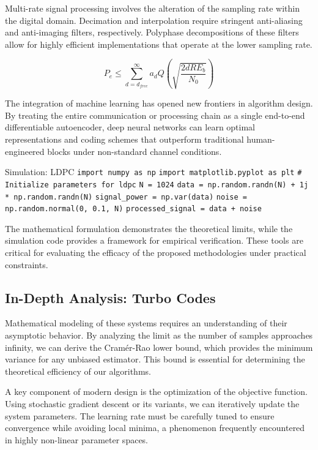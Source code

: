 Multi-rate signal processing involves the alteration of the sampling rate within the digital domain. Decimation and interpolation require stringent anti-aliasing and anti-imaging filters, respectively. Polyphase decompositions of these filters allow for highly efficient implementations that operate at the lower sampling rate.

\begin{equation}
    P_e \leq \sum_{d=d_{free}}^{\infty} a_d Q\left(\sqrt{\frac{2 d R E_b}{N_0}}\right)
\end{equation}

The integration of machine learning has opened new frontiers in algorithm design. By treating the entire communication or processing chain as a single end-to-end differentiable autoencoder, deep neural networks can learn optimal representations and coding schemes that outperform traditional human-engineered blocks under non-standard channel conditions.

\begin{pythonbox}{Simulation: LDPC}
\texttt{import numpy as np}
\texttt{import matplotlib.pyplot as plt}
\texttt{}
\texttt{\# Initialize parameters for ldpc}
\texttt{N = 1024}
\texttt{data = np.random.randn(N) + 1j * np.random.randn(N)}
\texttt{signal\_power = np.var(data)}
\texttt{noise = np.random.normal(0, 0.1, N)}
\texttt{processed\_signal = data + noise}
\end{pythonbox}

\vspace{0.5cm}
The mathematical formulation demonstrates the theoretical limits, while the simulation code provides a framework for empirical verification. These tools are critical for evaluating the efficacy of the proposed methodologies under practical constraints.


\subsection{In-Depth Analysis: Turbo Codes}
Mathematical modeling of these systems requires an understanding of their asymptotic behavior. By analyzing the limit as the number of samples approaches infinity, we can derive the Cramér-Rao lower bound, which provides the minimum variance for any unbiased estimator. This bound is essential for determining the theoretical efficiency of our algorithms.

A key component of modern design is the optimization of the objective function. Using stochastic gradient descent or its variants, we can iteratively update the system parameters. The learning rate must be carefully tuned to ensure convergence while avoiding local minima, a phenomenon frequently encountered in highly non-linear parameter spaces.

